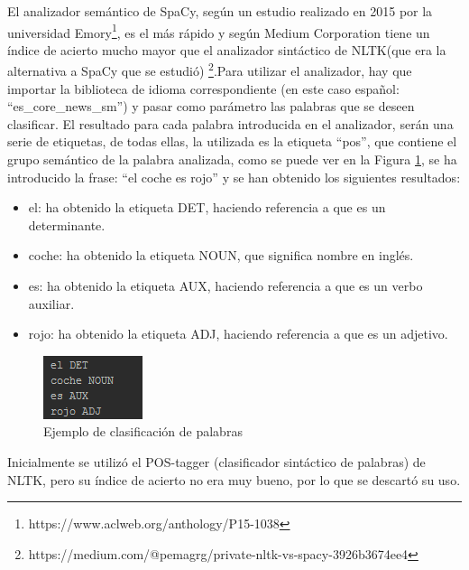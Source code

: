 El analizador semántico de SpaCy, según un estudio realizado en 2015 por la universidad Emory\footnote{https://www.aclweb.org/anthology/P15-1038}, es el más rápido y según Medium Corporation tiene un índice de acierto mucho mayor que el analizador sintáctico de NLTK(que era la alternativa a SpaCy que se estudió) \footnote{https://medium.com/@pemagrg/private-nltk-vs-spacy-3926b3674ee4}.Para utilizar el analizador, hay que importar la biblioteca de idioma correspondiente (en este caso español: ``es\_core\_news\_sm'') y pasar como parámetro las palabras que se deseen clasificar. El resultado para cada palabra introducida en el analizador, serán una serie de etiquetas, de todas ellas, la utilizada es la etiqueta ``pos'', que contiene el grupo semántico de la palabra analizada, como se puede ver en la Figura \ref{fig:spacy}, se ha introducido la frase: ``el coche es rojo'' y se han obtenido los siguientes resultados:
\begin{itemize}
	\item el: ha obtenido la etiqueta DET, haciendo referencia a que es un determinante.
	\item coche: ha obtenido la etiqueta NOUN, que significa nombre en inglés.
	\item es: ha obtenido la etiqueta AUX, haciendo referencia a que es un verbo auxiliar.
	\item rojo: ha obtenido la etiqueta ADJ, haciendo referencia a que es un adjetivo.
\end{itemize}

\begin{figure}[!h]
	\includegraphics[width=.4\textwidth]{Imagenes/Bitmap/Capitulo3/spacy}
	\centering
	\caption{Ejemplo de clasificación de palabras}
	\label{fig:spacy}
\end{figure}

Inicialmente se utilizó el POS-tagger (clasificador sintáctico de palabras) de NLTK, pero su índice de acierto no era muy bueno, por lo que se descartó su uso. 
